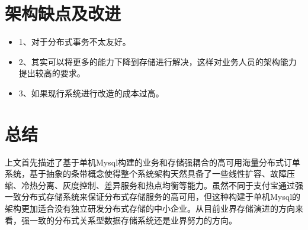 \documentclass[letterpaper,twocolumn,10pt]{article}
\begin{document}
\section{架构缺点及改进}
\begin{itemize}
\item 1、对于分布式事务不太友好。
\item 2、其实可以将更多的能力下降到存储进行解决，这样对业务人员的架构能力提出较高的要求。
\item 3、如果现行系统进行改造的成本过高。
\end{itemize}

\section{总结}

上文首先描述了基于单机Mysql构建的业务和存储强耦合的高可用海量分布式订单系统，基于抽象的条带概念使得整个系统架构天然具备了一些线性扩容、故障压缩、冷热分离、灰度控制、差异服务和热点均衡等能力。虽然不同于支付宝通过强一致分布式存储系统来保证分布式存储服务的高可用，但这种构建于单机Mysql的架构更加适合没有独立研发分布式存储的中小企业。从目前业界存储演进的方向来看，强一致的分布式关系型数据存储系统还是业界努力的方向。
\end{document}

